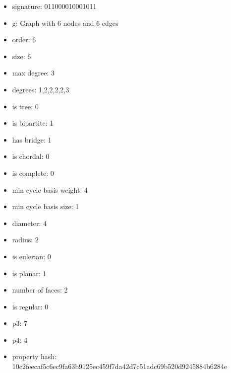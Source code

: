 \begin{itemize}
\item signature: 011000010001011
\item g: Graph with 6 nodes and 6 edges
\item order: 6
\item size: 6
\item max degree: 3
\item degrees: 1,2,2,2,2,3
\item is tree: 0
\item is bipartite: 1
\item has bridge: 1
\item is chordal: 0
\item is complete: 0
\item min cycle basis weight: 4
\item min cycle basis size: 1
\item diameter: 4
\item radius: 2
\item is eulerian: 0
\item is planar: 1
\item number of faces: 2
\item is regular: 0
\item p3: 7
\item p4: 4
\item property hash: 10c2feecaf5c6ec9fa63b9125ec459f7da42d7c51adc69b520d9245884b6284e
\end{itemize}
\newpage
\begin{figure}
\end{figure}
